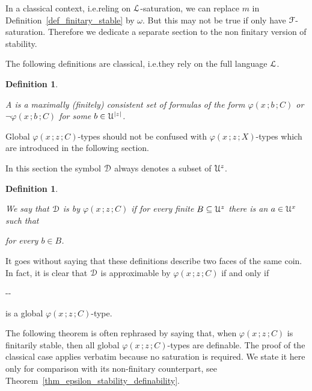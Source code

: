 \documentclass{amsproc}
\newcounter{thm}
\theoremstyle{mio}
\newtheorem{definition}[thm]{Definition}\tcolorboxenvironment{definition}{mythm}
\renewcommand*{\emph}[1]{%
   \smash{\tikz[baseline]\node[rectangle, fill=teal!25, rounded corners, inner xsep=0.5ex, inner ysep=0.2ex, anchor=base, minimum height = 2.7ex]{\strut #1};}}
\begin{document}
In a classical context, i.e.\@ reling on ${\EuScript L}$-saturation, we can replace $m$ in Definition~\ref{def_finitary_stable} by $\omega$.
But this may not be true if only have ${\EuScript F}$-saturation.
Therefore we dedicate a separate section to the non finitary version of stability.

The following definitions are classical, i.e.\@ they rely on the full language ${\EuScript L}$.

\begin{definition}\label{def_globaltype}\strut
  A \emph{global $\varphi(x\,;z\,;C)$-type\/} is a maximally (finitely) consistent set of formulas of the form $\varphi(x\,;b\,;C)$ or $\neg\varphi(x\,;b\,;C)$ for some $b\in{\EuScript U}^{|z|}$.
\end{definition}

Global $\varphi(x\,;z\,;C)$-types should not be confused with $\varphi(x\,;z\,;X)$-types which are introduced in the following section.

In this section the symbol ${\EuScript D}$ always denotes a subset of ${\EuScript U}^z$.

\begin{definition}\label{def_approx}\strut
  We say that ${\EuScript D}$ is \emph{approximable\/} by $\varphi(x\,;z\,;C)$ if for every finite $B\subseteq {\EuScript U}^z$ there is an $a\in {\EuScript U}^x$ such that\smallskip

  \hfill for every $b\in B$.
\end{definition}

It goes without saying that these definitions describe two faces of the same coin.
In fact, it is clear that ${\EuScript D}$ is approximable by $\varphi(x\,;z\,;C)$ if and only if  
    
  \noindent\kern-\kern-

is a global $\varphi(x\,;z\,;C)$-type.\smallskip

The following theorem is often rephrased by saying that, when $\varphi(x\,;z\,;C)$ is finitarily stable, then all global $\varphi(x\,;z\,;C)$-types are definable.
The proof of the classical case applies verbatim because no saturation is required.
We state it here only for comparison with its non-finitary counterpart, see Theorem~\ref{thm_epsilon_stability_definability}.
\end{document}
